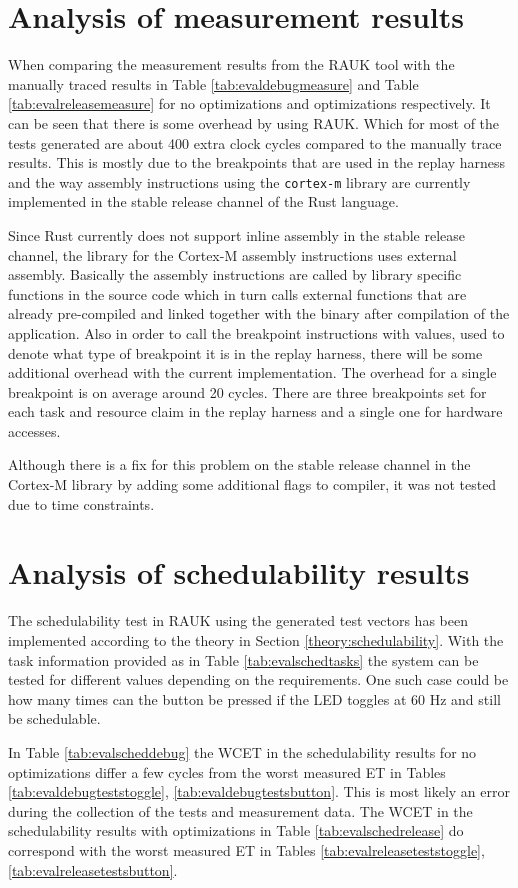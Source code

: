 \section{Analysis of measurement results}
When comparing the measurement results from the RAUK tool with the manually
traced results in Table \ref{tab:evaldebugmeasure} and Table
\ref{tab:evalreleasemeasure} for no optimizations and optimizations
respectively. It can be seen that there is some overhead by using RAUK. Which
for most of the tests generated are about 400 extra clock cycles compared to
the manually trace results. This is mostly due to the breakpoints that are used
in the replay harness and the way assembly instructions using the
\texttt{cortex-m} library are currently implemented in the stable release
channel of the Rust language.

Since Rust currently does not support inline assembly in the stable release
channel, the library for the Cortex-M assembly instructions uses external
assembly. Basically the assembly instructions are called by library specific
functions in the source code which in turn calls external functions that are
already pre-compiled and linked together with the binary after compilation of
the application. Also in order to call the breakpoint instructions with values,
used to denote what type of breakpoint it is in the replay harness, there will
be some additional overhead with the current implementation. The overhead for a
single breakpoint is on average around 20 cycles. There are three breakpoints
set for each task and resource claim in the replay harness and a single one for
hardware accesses.

Although there is a fix for this problem on the stable release channel in the
Cortex-M library by adding some additional flags to compiler, it was not
tested due to time constraints.

\section{Analysis of schedulability results}
The schedulability test in RAUK using the generated test vectors has been implemented
according to the theory in Section \ref{theory:schedulability}. With the task
information provided as in Table \ref{tab:evalschedtasks} the system can be
tested for different values depending on the requirements. One such case could
be how many times can the button be pressed if the LED toggles at 60 Hz and still
be schedulable.

In Table \ref{tab:evalscheddebug} the WCET in the schedulability results for no
optimizations differ a few cycles from the worst measured ET in Tables
\ref{tab:evaldebugteststoggle}, \ref{tab:evaldebugtestsbutton}. This is most
likely an error during the collection of the tests and measurement data. The
WCET in the schedulability results with optimizations in Table
\ref{tab:evalschedrelease} do correspond with the worst measured ET in Tables
\ref{tab:evalreleaseteststoggle}, \ref{tab:evalreleasetestsbutton}.

